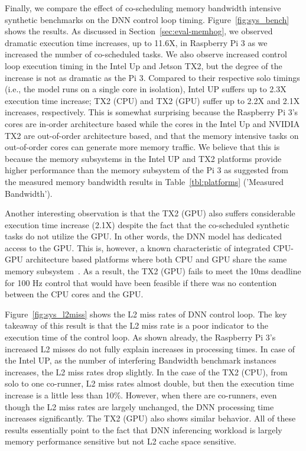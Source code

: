 Finally, we compare the effect of co-scheduling memory bandwidth
intensive synthetic benchmarks on the DNN control loop timing. 
Figure~\ref{fig:sys_bench} shows the results. As discussed in 
Section~\ref{sec:eval-memhog}, we observed dramatic execution time
increases, up to 11.6X, in Raspberry Pi 3 as we increased the number of
co-scheduled tasks. We also observe increased control loop execution
timing in the Intel Up and Jetson TX2, but the degree of the increase is 
not as dramatic as the Pi 3. Compared to their respective solo timings 
(i.e., the model runs on a single core in isolation), Intel UP suffers up to
2.3X execution time increase; TX2 (CPU) and TX2 (GPU) suffer up to
2.2X and 2.1X increases, respectively. This is somewhat surprising
because the Raspberry Pi 3's cores are in-order architecture based while
the cores in the Intel Up and NVIDIA TX2 are out-of-order architecture
based, and that the memory intensive tasks on out-of-order cores can
generate more memory traffic. We believe that this is because the
memory subsystems in the Intel UP and TX2 platforms provide higher
performance than the memory subsystem of the Pi 3 as suggested from
the measured memory bandwidth results in Table~\ref{tbl:platforms}
('Measured Bandwidth').

Another interesting observation is that the TX2 (GPU) also suffers
considerable execution time increase (2.1X) despite the fact that the
co-scheduled synthetic tasks do not utilize the GPU. In other words,
the DNN model has dedicated access to the GPU. This is, however, a
known characteristic of integrated CPU-GPU architecture based
platforms where both CPU and GPU share the same memory
subsystem~\cite{Ali2017}. As a result, the TX2 (GPU) fails to meet the
10ms deadline for 100 Hz control that would have been feasible if
there was no contention between the CPU cores and the GPU.

Figure~\ref{fig:sys_l2miss} shows the L2 miss rates of DNN control
loop. The key takeaway of this result is that the L2 miss rate is a
poor indicator to the execution time of the control loop. As shown
already, the Raspberry Pi 3's increased L2 misses do not fully explain
increases in processing times. In case of the Intel UP, as the number of
interfering Bandwidth benchmark instances increases, the L2 miss rates
drop slightly. In the case of the TX2 (CPU), from solo to one co-runner,
L2 miss rates almost double, but then the execution time
increase is a little less than 10\%. However, when there are
co-runners, even though the L2 miss rates are largely unchanged, the
DNN processing time increases significantly. The TX2 (GPU) also shows
similar behavior. All of these results essentially point to the fact
that DNN inferencing workload is largely memory performance sensitive
but not L2 cache space sensitive. 

